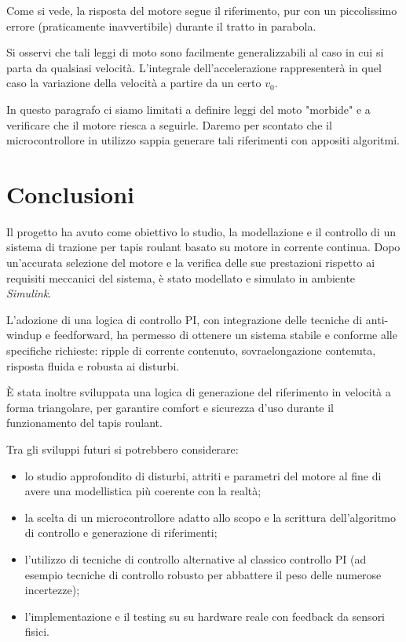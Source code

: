 \documentclass[a4paper,12pt]{article}
\begin{document}
\vspace{0.5cm}

Come si vede, la risposta del motore segue il riferimento, pur con un piccolissimo errore (praticamente inavvertibile) durante il tratto in parabola.

\vspace{0.3cm}

Si osservi che tali leggi di moto sono facilmente generalizzabili al caso in cui si parta da qualsiasi velocità. L'integrale dell'accelerazione rappresenterà in quel caso la variazione della velocità a partire da un certo $v_0$.

\vspace{0.5cm}

In questo paragrafo ci siamo limitati a definire leggi del moto "morbide" e a verificare che il motore riesca a seguirle.
Daremo per scontato che il microcontrollore in utilizzo sappia generare tali riferimenti con appositi algoritmi.

\newpage


\section{Conclusioni}

Il progetto ha avuto come obiettivo lo studio, la modellazione e il controllo di un sistema di trazione per tapis roulant basato su motore in corrente continua. Dopo un’accurata selezione del motore e la verifica delle sue prestazioni rispetto ai requisiti meccanici del sistema, è stato modellato e simulato in ambiente \textit{Simulink}.

L'adozione di una logica di controllo PI, con integrazione delle tecniche di anti-windup e feedforward, ha permesso di ottenere un sistema stabile e conforme alle specifiche richieste: ripple di corrente contenuto, sovraelongazione contenuta, risposta fluida e robusta ai disturbi.

È stata inoltre sviluppata una logica di generazione del riferimento in velocità a forma triangolare, per garantire comfort e sicurezza d'uso durante il funzionamento del tapis roulant.

\bigskip

Tra gli sviluppi futuri si potrebbero considerare:

\begin{itemize}
    \item lo studio approfondito di disturbi, attriti e parametri del motore al fine di avere una modellistica più coerente con la realtà;
    \item la scelta di un microcontrollore adatto allo scopo e la scrittura dell'algoritmo di controllo e generazione di riferimenti; 
    \item l'utilizzo di tecniche di controllo alternative al classico controllo PI (ad esempio tecniche di controllo robusto per abbattere il peso delle numerose incertezze);
    \item l’implementazione e il testing su su hardware reale con feedback da sensori fisici.
\end{itemize}
\end{document}
